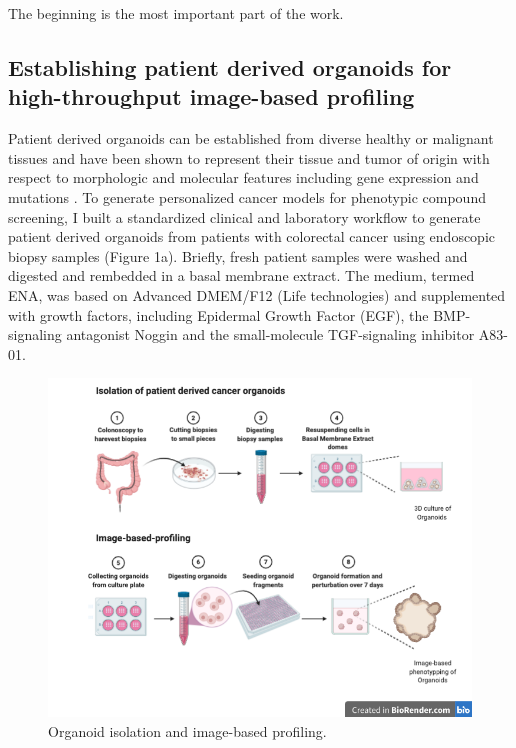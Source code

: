 \begin{savequote}[75mm]
The beginning is the most important part of the work.
\end{savequote}

\begin{flushleft}
\chapter{Establishing patient derived organoids for high-throughput image-based profiling}

Patient derived organoids can be established from diverse healthy or malignant tissues and have been shown to represent their tissue and tumor of origin with respect to morphologic and molecular features including gene expression and mutations \cite{Fujii:2016jo, Weeber2015-sn, Van_De_Wetering2015-ko, Sato:2011-1h,  Broutier2017-wg}. To generate personalized cancer models for phenotypic compound screening, I built a standardized clinical and laboratory workflow to generate patient derived organoids from patients with colorectal cancer using endoscopic biopsy samples (Figure 1a). Briefly, fresh patient samples were washed and digested and rembedded in a basal membrane extract. The medium, termed ENA, was based on Advanced DMEM/F12 (Life technologies) and supplemented with growth factors, including Epidermal Growth Factor (EGF), the BMP-signaling antagonist Noggin and the small-molecule TGF\beta-signaling inhibitor A83-01. 

\begin{figure}[h]
\centering
\includegraphics[scale=.35]{figures/organoid_establishment.png}
\caption{Organoid isolation and image-based profiling.}
\label{colon_cancer_progression}
\end{figure}


\end{flushleft}
